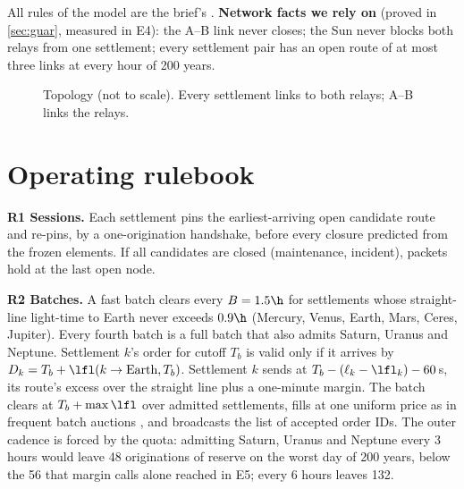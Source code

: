 All rules of the model are the brief's \cite{brief}. \textbf{Network facts we rely on} (proved in \cref{sec:guar}, measured in E4): the A--B link never closes; the Sun never blocks both relays from one settlement; every settlement pair has an open route of at most three links at every hour of 200 years.
\begin{figure}[H]
\centering
{}
\caption{Topology (not to scale). Every settlement links to both relays; A--B links the relays.}
\end{figure}
\vspace{-8pt}
\section{Operating rulebook}\label{sec:rules}
\textbf{R1 Sessions.} Each settlement pins the earliest-arriving open candidate route and re-pins, by a one-origination handshake, before every closure predicted from the frozen elements. If all candidates are closed (maintenance, incident), packets hold at the last open node.

\textbf{R2 Batches.} A fast batch clears every $B=1.5\h$ for settlements whose straight-line light-time to Earth never exceeds $0.9\h$ (Mercury, Venus, Earth, Mars, Ceres, Jupiter). Every fourth batch is a full batch that also admits Saturn, Uranus and Neptune. Settlement $k$'s order for cutoff $T_b$ is valid only if it arrives by $D_k = T_b + \lfl(k\to\text{Earth},T_b)$. Settlement $k$ sends at $T_b - (\ell_k - \lfl_k) - 60\,$s, its route's excess over the straight line plus a one-minute margin. The batch clears at $T_b+\max\lfl$ over admitted settlements, fills at one uniform price as in frequent batch auctions \cite{budish2015}, and broadcasts the list of accepted order IDs. The outer cadence is forced by the quota: admitting Saturn, Uranus and Neptune every 3 hours would leave 48 originations of reserve on the worst day of 200 years, below the 56 that margin calls alone reached in E5; every 6 hours leaves 132.


